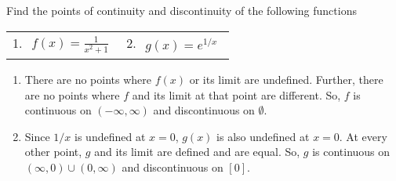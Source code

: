 \begin{example}
	Find the points of continuity and discontinuity of the following functions
	\begin{table}[H]
	\begin{center}
	\begin{tabular}{ l l }
		1. $\begin{aligned}
			f(x) = \frac{1}{x^2+1}
		\end{aligned}$ &
		2. $\begin{aligned}
			g(x) = e^{1/x}
		\end{aligned}$
	\end{tabular}
	\end{center}
	\end{table}
\end{example}
\begin{answer}
	\begin{enumerate}
		\item There are no points where $f(x)$ or its limit are undefined.
			Further, there are no points where $f$ and its limit at that point are different.
			So, $f$ is continuous on $(-\infty, \infty)$ and discontinuous on $\emptyset$.
		\item Since $1/x$ is undefined at $x = 0$, $g(x)$ is also undefined at $x=0$.
			At every other point, $g$ and its limit are defined and are equal.
			So, $g$ is continuous on $(\infty, 0) \cup (0, \infty)$ and discontinuous on $[0]$.
	\end{enumerate}
\end{answer}